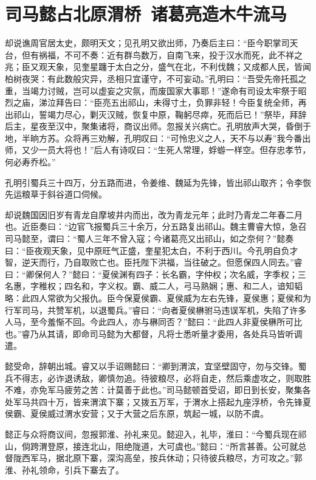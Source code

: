 \chapter{司马懿占北原渭桥~诸葛亮造木牛流马}

却说谯周官居太史，颇明天文；见孔明又欲出师，乃奏后主曰：“臣今职掌司天台，但有祸福，不可不奏：近有群鸟数万，自南飞来，投于汉水而死，此不祥之兆；臣又观天象，见奎星躔于太白之分，盛气在北，不利伐魏；又成都人民，皆闻柏树夜哭：有此数般灾异，丞相只宜谨守，不可妄动。”孔明曰：“吾受先帝托孤之重，当竭力讨贼，岂可以虚妄之灾氛，而废国家大事耶！”遂命有司设太牢祭于昭烈之庙，涕泣拜告曰：“臣亮五出祁山，未得寸土，负罪非轻！今臣复统全师，再出祁山，誓竭力尽心，剿灭汉贼，恢复中原，鞠躬尽瘁，死而后已！”祭毕，拜辞后主，星夜至汉中，聚集诸将，商议出师。忽报关兴病亡。孔明放声大哭，昏倒于地，半晌方苏。众将再三劝解，孔明叹曰：“可怜忠义之人，天不与以寿”我今番出师，又少一员大将也！”后人有诗叹曰：“生死人常理，蜉蝣一样空。但存忠孝节，何必寿乔松。”

孔明引蜀兵三十四万，分五路而进，令姜维、魏延为先锋，皆出祁山取齐；令李恢先运粮草于斜谷道口伺候。

却说魏国因旧岁有青龙自摩坡井内而出，改为青龙元年；此时乃青龙二年春二月也。近臣奏曰：“边官飞报蜀兵三十余万，分五路复出祁山。魏主曹睿大惊，急召司马懿至，谓曰：“蜀人三年不曾入寇；今诸葛亮又出祁山，如之奈何？”懿奏曰：“臣夜观天象，见中原旺气正盛，奎星犯太白，不利于西川。今孔明自负才智，逆天而行，乃自取败亡也。臣托陛下洪福，当往破之。但愿保四人同去。”睿曰：“卿保何人？”懿曰：“夏侯渊有四子：长名霸，字仲权；次名威，字季权；三名惠，字稚权；四名和，字义权。霸、威二人，弓马熟娴；惠、和二人，谙知韬略：此四人常欲为父报仇。臣今保夏侯霸、夏侯威为左右先锋，夏侯惠；夏侯和为行军司马，共赞军机，以退蜀兵。”睿曰：“向者夏侯楙驸马违误军机，失陷了许多人马，至今羞惭不回。今此四人，亦与楙同否？”懿曰：“此四人非夏侯楙所可比也。”睿乃从其请，即命司马懿为大都督，凡将士悉听量才委用，各处兵马皆听调遣。

懿受命，辞朝出城。睿又以手诏赐懿曰：“卿到渭滨，宜坚壁固守，勿与交锋。蜀兵不得志，必诈退诱敌，卿慎勿追。待彼粮尽，必将自走，然后乘虚攻之，则取胜不难，亦免军马疲劳之苦：计莫善于此也。”司马懿顿首受诏，即日到长安，聚集各处军马共四十万，皆来渭滨下寨；又拨五万军，于渭水上搭起九座浮桥，令先锋夏侯霸、夏侯威过渭水安营；又于大营之后东原，筑起一城，以防不虞。

懿正与众将商议间，忽报郭淮、孙礼来见。懿迎入，礼毕，淮曰：“今蜀兵现在祁山，倘跨渭登原，接连北山，阻绝陇道，大可虞也。”懿曰：“所言甚善。公可就总督陇西军马，据北原下寨，深沟高垒，按兵休动；只待彼兵粮尽，方可攻之。”郭淮、孙礼领命，引兵下寨去了。

